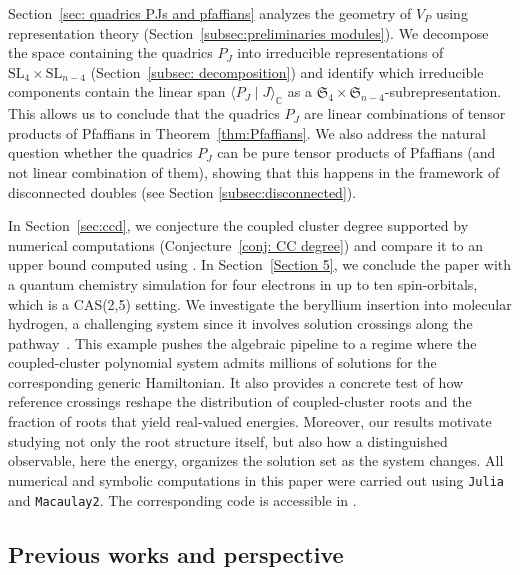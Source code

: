 \documentclass[11pt,reqno]{amsart}
\theoremstyle{definition}
\numberwithin{theorem}{section}
\numberwithin{equation}{section}
\begin{document}
Section~\ref{sec: quadrics PJs and pfaffians} analyzes the geometry of $V_P$ using representation theory (Section~\ref{subsec:preliminaries modules}). We decompose the space containing the quadrics $P_J$ into irreducible representations of $\mathrm{SL}_{4}\times\mathrm{SL}_{n-4}$ (Section~\ref{subsec: decomposition})  and identify which irreducible components contain the linear span $\langle P_J\mid J\rangle_{\mathbb{C}}$ as a $\mathfrak{S}_4\times\mathfrak{S}_{n-4}$-subrepresentation. This allows us to conclude that the quadrics $P_J$ are linear combinations of tensor products of Pfaffians in Theorem~\ref{thm:Pfaffians}. We also address the natural question whether the quadrics $P_J$ can be pure tensor products of Pfaffians (and not linear combination of them), showing that this happens in the framework of disconnected doubles (see Section \ref{subsec:disconnected}). 

In Section~\ref{sec:ccd}, we conjecture the coupled cluster degree supported by numerical computations (Conjecture~\ref{conj: CC degree}) and compare it to an upper bound computed using \cite[Theorem~5.2]{faulstich2024algebraic}. In Section~\ref{Section 5}, we conclude the paper with a quantum chemistry simulation for four electrons in up to ten spin-orbitals, which is a CAS(2,5) setting. We investigate the beryllium insertion into molecular hydrogen, a challenging system since it involves solution crossings along the pathway~\cite{purvis1983c2v}. This example pushes the algebraic pipeline to a regime where the coupled-cluster polynomial system admits millions of solutions for the corresponding generic Hamiltonian. It also provides a concrete test of how reference crossings reshape the distribution of coupled-cluster roots and the fraction of roots that yield real-valued energies. Moreover, our results motivate studying not only the root structure itself, but also how a distinguished observable, here the energy, organizes the solution set as the system changes. All numerical and symbolic computations in this paper were carried out using \texttt{Julia} and \texttt{Macaulay2}. The corresponding code is accessible in \cite{Faulstich2025SupplementaryCode}.


\subsection{Previous works and perspective}
\end{document}
